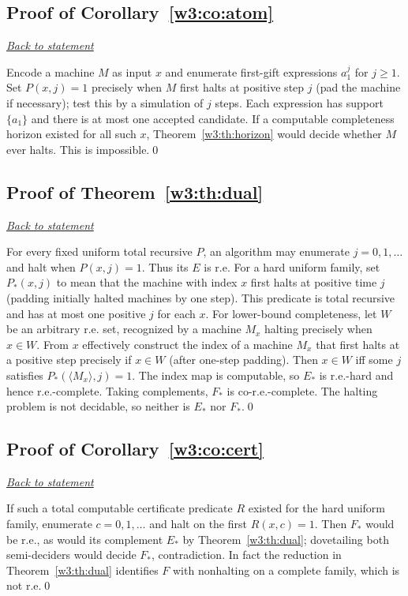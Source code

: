 \documentclass[11pt,letterpaper]{article}
\theoremstyle{definition}\newtheorem{definition}[theorem]{Definition}\newtheorem{example}[theorem]{Example}
\theoremstyle{remark}\newtheorem{remark}[theorem]{Remark}
\newcommand{\backlink}[1]{\noindent\hyperref[#1]{\textit{Back to statement}}\par\smallskip}
\begin{document}
\subsection{Proof of Corollary~\ref{w3:co:atom}}\label{w3:pr:atom}\backlink{w3:co:atom}
Encode a machine $M$ as input $x$ and enumerate first-gift expressions $a_1^j$ for $j\ge1$. Set $P(x,j)=1$ precisely when $M$ first halts at positive step $j$ (pad the machine if necessary); test this by a simulation of $j$ steps. Each expression has support $\{a_1\}$ and there is at most one accepted candidate. If a computable completeness horizon existed for all such $x$, Theorem~\ref{w3:th:horizon} would decide whether $M$ ever halts. This is impossible.\qed


\subsection{Proof of Theorem~\ref{w3:th:dual}}\label{w3:pr:dual}\backlink{w3:th:dual}
For every fixed uniform total recursive $P$, an algorithm may enumerate $j=0,1,\dots$ and halt when $P(x,j)=1$. Thus its $E$ is r.e. For a hard uniform family, set $P_*(x,j)$ to mean that the machine with index $x$ first halts at positive time $j$ (padding initially halted machines by one step). This predicate is total recursive and has at most one positive $j$ for each $x$. For lower-bound completeness, let $W$ be an arbitrary r.e. set, recognized by a machine $M_x$ halting precisely when $x\in W$. From $x$ effectively construct the index of a machine $M_x$ that first halts at a positive step precisely if $x\in W$ (after one-step padding). Then $x\in W$ iff some $j$ satisfies $P_*(\langle M_x\rangle,j)=1$. The index map is computable, so $E_*$ is r.e.-hard and hence r.e.-complete. Taking complements, $F_*$ is co-r.e.-complete. The halting problem is not decidable, so neither is $E_*$ nor $F_*$.\qed


\subsection{Proof of Corollary~\ref{w3:co:cert}}\label{w3:pr:cert}\backlink{w3:co:cert}
If such a total computable certificate predicate $R$ existed for the hard uniform family, enumerate $c=0,1,\dots$ and halt on the first $R(x,c)=1$. Then $F_*$ would be r.e., as would its complement $E_*$ by Theorem~\ref{w3:th:dual}; dovetailing both semi-deciders would decide $F_*$, contradiction. In fact the reduction in Theorem~\ref{w3:th:dual} identifies $F$ with nonhalting on a complete family, which is not r.e.\qed
\end{document}
